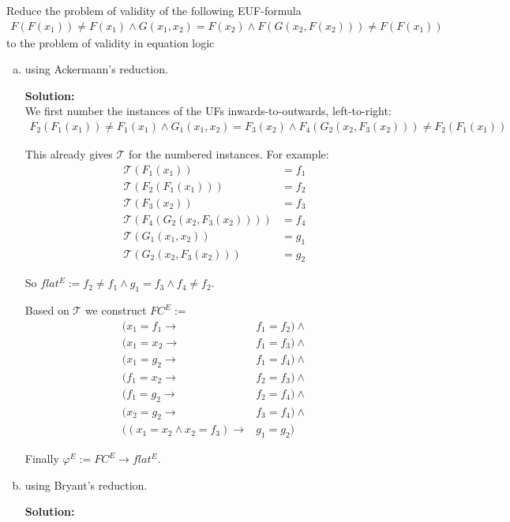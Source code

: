 \documentclass[11pt,a4paper]{uebung}
\newcommand{\solution}[1]{\par {\bf Solution:}\\#1}
\def\cT{\mathcal{T}}
\begin{document}
Reduce the problem of validity of the following EUF-formula
\begin{gather*}
  F(F(x_1)) \neq F(x_1) \land G(x_1,x_2) = F(x_2) \land F(G(x_2,F(x_2))) \neq F(F(x_1))
\end{gather*}
to the problem of validity in equation logic
\begin{enumerate}[a)]
\item using Ackermann's reduction.

\solution{
  We first number the instances of the UFs inwards-to-outwards, left-to-right:
  \begin{gather*}
    F_2(F_1(x_1)) \neq F_1(x_1) \land G_1(x_1,x_2) = F_3(x_2) \land F_4(G_2(x_2,F_3(x_2))) \neq F_2(F_1(x_1))
  \end{gather*}
  
  This already gives $\cT$ for the numbered instances. For example:
  \begin{align*}
    \cT (F_1(x_1)) &= f_1\\
    \cT (F_2(F_1(x_1))) &= f_2\\
    \cT (F_3(x_2)) &= f_3 \\
    \cT (F_4(G_2(x_2,F_3(x_2)))) &= f_4 \\
    \cT (G_1(x_1,x_2)) &= g_1\\
    \cT (G_2(x_2,F_3(x_2))) &= g_2
  \end{align*}


  So $flat^E:= f_2 \neq f_1 \land g_1 = f_3 \land f_4 \neq f_2$.

  Based on $\cT$ we construct $FC^E :=$
  \def\impl{\rightarrow}
  \begin{align*}
    (x_1 = f_1 \impl& f_1 = f_2) \land \\
    (x_1 = x_2 \impl& f_1 = f_3) \land \\
    (x_1 = g_2 \impl& f_1 = f_4) \land \\
    (f_1 = x_2 \impl& f_2 = f_3) \land \\
    (f_1 = g_2 \impl& f_2 = f_4) \land \\
    (x_2 = g_2 \impl& f_3 = f_4) \land \\
    (( x_1 = x_2 \land x_2 = f_3 ) \impl& g_1 = g_2)
  \end{align*}

  Finally $\varphi^E := FC^E \impl flat^E$.
}

\item using Bryant's reduction.

\solution{

}
\end{enumerate}
\end{document}
